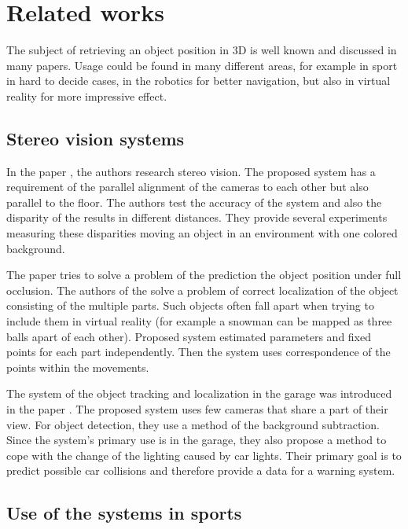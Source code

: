 \chapter{Related works} 

The subject of retrieving an object position in 3D is well known and discussed
in many papers. Usage could be found in many different areas, for example in
sport in hard to decide cases, in the robotics for better navigation, but
also in virtual reality for more impressive effect.

\section{Stereo vision systems}

In the paper \citet*{zheng2010study}, the authors research stereo vision. The
proposed system has a requirement of the parallel alignment of the cameras to
each other but also parallel to the floor. The authors test the accuracy of the
system and also the disparity of the results in different distances. They
provide several experiments measuring these disparities moving an object in an
environment with one colored background.

The paper \citet*{black2002multi} tries to solve a problem of the prediction
the object position under full occlusion. The authors of the
\citet*{yonemoto1998tracking} solve a problem of correct localization of the
object consisting of the multiple parts. Such objects often fall apart when
trying to include them in virtual reality (for example a snowman can be mapped
as three balls apart of each other). Proposed system estimated parameters and
fixed points for each part independently. Then the system uses correspondence
of the points within the movements.

The system of the object tracking and localization in the garage was introduced
in the paper \citet*{ibisch2015arbitrary}. The proposed system uses few cameras
that share a part of their view. For object detection, they use a method of the
background subtraction. Since the system's primary use is in the garage, they
also propose a method to cope with the change of the lighting caused by car
lights. Their primary goal is to predict possible car collisions and therefore
provide a data for a warning system.

\section{Use of the systems in sports}

